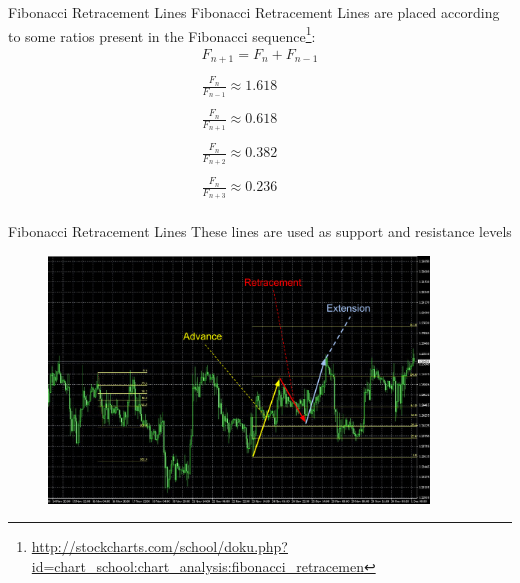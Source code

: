 \documentclass[12pt,portuguese]{beamer}
\begin{document}
\begin{frame}{Fibonacci Retracement Lines}
	Fibonacci Retracement Lines are placed according to some ratios present in the Fibonacci sequence\footnote{\url{http://stockcharts.com/school/doku.php?id=chart_school:chart_analysis:fibonacci_retracemen}}:
\begin{equation*}
\begin{array}{rcl}
	F_{n+1} = F_n + F_{n-1}\\
	\\
	\frac{F_n}{F_{n-1}} \approx 1.618 \\
	\\
	\frac{F_n}{F_{n+1}} \approx 0.618 \\
	\\
	\frac{F_n}{F_{n+2}} \approx 0.382 \\
	\\
	\frac{F_n}{F_{n+3}} \approx 0.236 \\
\end{array}
\end{equation*}
\end{frame}
	
\begin{frame}{Fibonacci Retracement Lines}
	These lines are used as support and resistance levels
	\begin{figure}[h]
	\centering
	\includegraphics[width=0.9\textwidth]{images/mt4_fibo.pdf}
	\end{figure}
\end{frame}
\end{document}
